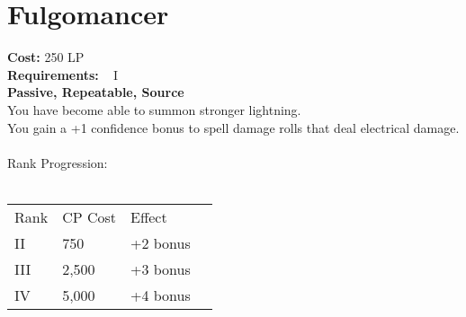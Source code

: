 \section{Fulgomancer}\label{perk:fulgomancer}
\textbf{Cost:} 250 LP\\
\textbf{Requirements:} ~ I\\
\textbf{Passive, Repeatable, Source}\\
You have become able to summon stronger lightning.\\
You gain a +1 confidence bonus to spell damage rolls that deal electrical damage.\\
\\
Rank Progression:\\
\\
\begin{tabular}{l | l | l | l}
    Rank & CP Cost &  Effect\\
    II & 750 & +2 bonus\\
    III & 2,500 & +3 bonus\\
    IV & 5,000 & +4 bonus\\
\end{tabular}